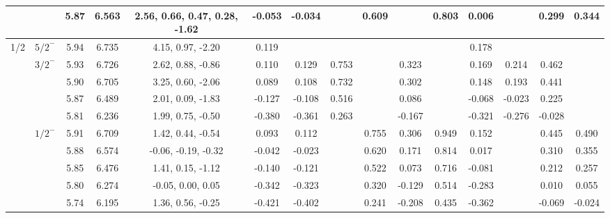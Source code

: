\documentclass[prd,twocolumn,floatfix,nofootinbib]{revtex4}
\begin{document}
\begin{table*}[!htbp]
\begin{tabular}{cc|ccc|cccccccccc}
            &               &5.87   &6.563  &2.56, 0.66, 0.47, 0.28, -1.62 &-0.053 &-0.034 & &0.609 & &0.803 &0.006 & &0.299 &0.344 \\
         \hline   
        1/2
            &${5/2}^{-}$    &5.94   &6.735  &4.15, 0.97, -2.20 &0.119 & & & & & &0.178 & & & \\
            &${3/2}^{-}$    &5.93   &6.726  &2.62, 0.88, -0.86 &0.110 &0.129 &0.753 & &0.323 & &0.169 &0.214 &0.462 & \\
            &               &5.90   &6.705  &3.25, 0.60, -2.06 &0.089 &0.108 &0.732 & &0.302 & &0.148 &0.193 &0.441 & \\
            &               &5.87   &6.489  &2.01, 0.09, -1.83 &-0.127 &-0.108 &0.516 & &0.086 & &-0.068 &-0.023 &0.225 & \\
            &               &5.81   &6.236  &1.99, 0.75, -0.50 &-0.380 &-0.361 &0.263 & &-0.167 & &-0.321 &-0.276 &-0.028 & \\
            &${1/2}^{-}$    &5.91   &6.709  &1.42, 0.44, -0.54 &0.093 &0.112 & &0.755 &0.306 &0.949 &0.152 & &0.445 &0.490 \\
            &               &5.88   &6.574  &-0.06, -0.19, -0.32 &-0.042 &-0.023 & &0.620 &0.171 &0.814 &0.017 & &0.310 &0.355 \\
            &               &5.85   &6.476  &1.41, 0.15, -1.12 &-0.140 &-0.121 & &0.522 &0.073 &0.716 &-0.081 & &0.212 &0.257 \\
            &               &5.80   &6.274  &-0.05, 0.00, 0.05 &-0.342 &-0.323 & &0.320 &-0.129 &0.514 &-0.283 & &0.010 &0.055 \\
            &               &5.74   &6.195  &1.36, 0.56, -0.25 &-0.421 &-0.402 & &0.241 &-0.208 &0.435 &-0.362 & &-0.069 &-0.024 \\
        \bottomrule[0.5pt]\bottomrule[1.5pt]
    \end{tabular}
\end{table*}
\end{document}
